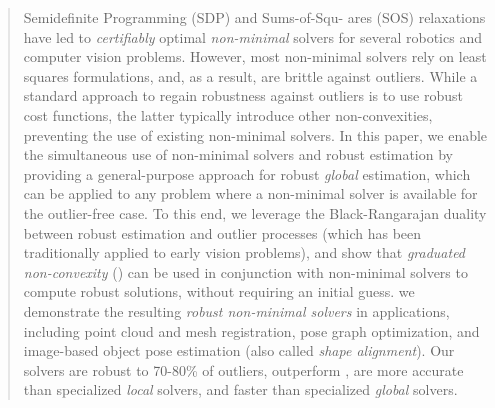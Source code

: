 \vspace{-3.7mm}
\begin{abstract}
Semidefinite Programming (SDP) and Sums-of-Squ- ares (SOS) relaxations have 
led to
\emph{certifiably} optimal \emph{non-minimal} solvers for several robotics and computer vision problems. 
However, most non-minimal solvers rely on least squares formulations, and, as a result, are 
brittle against
outliers.
%
While a standard approach to regain robustness against outliers 
is to use robust cost functions, the latter 
typically introduce 
other non-convexities, 
preventing 
the use of 
existing 
non-minimal solvers.
In this paper, we 
enable the simultaneous use of 
non-minimal solvers and robust estimation
%
by providing a general-purpose approach for robust \emph{global} estimation, which can be applied to any {problem where a non-minimal solver is available for the outlier-free case.}
To this end,
we leverage the Black-Rangarajan duality between robust estimation and outlier processes (which has been traditionally applied to early vision problems), and show that
\emph{graduated non-convexity} (\GNC) 
can be used 
in conjunction with non-minimal solvers 
to compute robust solutions, without requiring 
an initial guess. %
we demonstrate the resulting \emph{robust non-minimal solvers} in applications, including 
point cloud and mesh registration, pose graph optimization, and image-based object pose estimation (also called \emph{shape alignment}).
Our solvers are robust to {70-80\%} of outliers, 
outperform \ransac, 
are more accurate than specialized \emph{local} solvers, and 
faster than specialized \emph{global} solvers.

\end{abstract}
